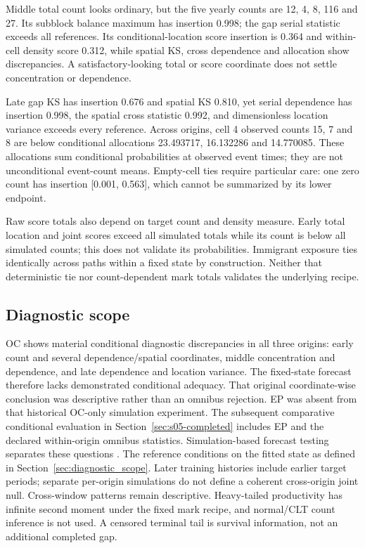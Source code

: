 Middle total count looks ordinary, but the five yearly counts are 12, 4, 8, 116 and 27. Its subblock balance maximum has insertion 0.998; the gap serial statistic exceeds all references. Its conditional-location score insertion is 0.364 and within-cell density score 0.312, while spatial KS, cross dependence and allocation show discrepancies. A satisfactory-looking total or score coordinate does not settle concentration or dependence.

Late gap KS has insertion 0.676 and spatial KS 0.810, yet serial dependence has insertion 0.998, the spatial cross statistic 0.992, and dimensionless location variance exceeds every reference. Across origins, cell 4 observed counts 15, 7 and 8 are below conditional allocations 23.493717, 16.132286 and 14.770085. These allocations sum conditional probabilities at observed event times; they are not unconditional event-count means. Empty-cell ties require particular care: one zero count has insertion [0.001, 0.563], which cannot be summarized by its lower endpoint.

Raw score totals also depend on target count and density measure. Early total location and joint scores exceed all simulated totals while its count is below all simulated counts; this does not validate its probabilities. Immigrant exposure ties identically across paths within a fixed state by construction. Neither that deterministic tie nor count-dependent mark totals validates the underlying recipe.

\subsection{Diagnostic scope}

OC shows material conditional diagnostic discrepancies in all three origins: early count and several dependence/spatial coordinates, middle concentration and dependence, and late dependence and location variance. The fixed-state forecast therefore lacks demonstrated conditional adequacy. That original coordinate-wise conclusion was descriptive rather than an omnibus rejection. EP was absent from that historical OC-only simulation experiment. The subsequent comparative conditional evaluation in Section~\ref{sec:s05-completed} includes EP and the declared within-origin omnibus statistics. Simulation-based forecast testing separates these questions \citep{Schorlemmer2007,Zechar2010}. The reference conditions on the fitted state as defined in Section~\ref{sec:diagnostic_scope}. Later training histories include earlier target periods; separate per-origin simulations do not define a coherent cross-origin joint null. Cross-window patterns remain descriptive. Heavy-tailed productivity has infinite second moment under the fixed mark recipe, and normal/CLT count inference is not used. A censored terminal tail is survival information, not an additional completed gap.

